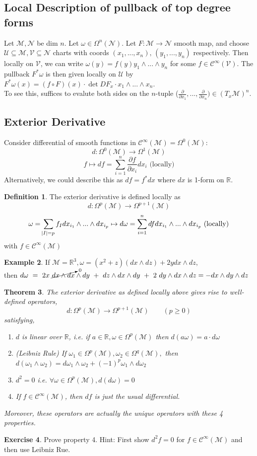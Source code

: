 \documentclass[10pt]{article}
\theoremstyle{plain}
\newtheorem{thm}{Theorem}[section] %
\theoremstyle{definition}
\newtheorem{defn}[thm]{Definition} %
\newtheorem{exmp}[thm]{Example} %
\newtheorem{exercise}[thm]{Exercise}
\newcommand{\Real}{\mathbb{R}}
\newcommand{\man}{\mathcal{M}}
\newcommand{\nan}{\mathcal{N}}
\newcommand{\chartU}{\mathcal{U}}
\newcommand{\allthe}[3]{{#1}_{#2},...,{#1}_{#3}}
\newcommand{\wedgge}{\omega_1\wedge\omega_2}
\newcommand{\allthewedge}[3]{{#1}_{#2}\wedge...\wedge{#1}_{#3}}
\newcommand{\tang}{T_x\man}
\newcommand{\pformman}[1]{\Omega^{#1}(\man)}
\newcommand{\pformnan}[1]{\Omega^{#1}(\nan)}
\newcommand{\iparderiv}[1]{\frac{\partial}{\partial x_{#1}}}
\newcommand{\iparderivof}[2]{\frac{\partial {#2}}{\partial x_{#1}}}
\newcommand{\dx}{dx}
\newcommand{\dy}{dy}
\newcommand{\dz}{dz}
\newcommand{\deriv}{d}
\newcommand{\df}{df}
\newcommand{\dw}{d\omega}
\newcommand{\cts}[1]{\mathcal{C}^{\infty}(#1)}
\newcommand{\sumfromto}[2]{\sum\limits_{#1}^{#2}}
\newcommand{\mysection}[1]{
    \setcounter{thm}{0}
    \section*{#1}
    \addcontentsline{toc}{section}{#1}
    \addtocounter{section}{1}
    \setcounter{subsection}{0}

}
\newcommand{\mysubsection}[1]{
    \subsection{#1}
}
\begin{document}
\mysubsection{Local Description of pullback of top degree forms}
Let $\man,\nan$ be dim $n$. Let $\omega \in \pformnan{n}$. Let $F:\man \to \nan$ smooth map, and choose $\chartU \subseteq\man, \mathcal{V} \subseteq\nan$ charts with coords $(\allthe{x}{1}{n}) , \, (\allthe{y}{1}{n})$ respectively. Then locally on $\mathcal{V}$, we can write $\omega(y) = f(y) \allthewedge{y}{1}{n}$ for some $f\in \cts{\mathcal{V}}$. The pullback $F^*\omega$ is then given locally on $\chartU$ by $F^*\omega(x) = (f\circ F)(x) \cdot \det DF_x \cdot \allthewedge{x}{1}{n}.$ \\
To see this, suffices to evalute both sides on the $n$-tuple ($\iparderiv{1},...,\iparderiv{n})\in(\tang)^n$.
\mysubsection{Exterior Derivative}
Consider differential of smooth functions in $\cts{\man} = \pformman{0}$:
$$\deriv : \pformman{0} \to \pformman{1}$$
$$ f \mapsto \df = \sumfromto{i=1}{n} \iparderivof{i}{f} \dx_i \text{   (locally)}$$
Alternatively, we could describe this as $\df = f^* \dx$ where $\dx$ is 1-form on $\Real$.
\begin{defn}
The exterior derivative is defined locally as
$$\deriv : \pformman{p} \to \pformman{p+1}$$
$$ \omega = \sum\limits_{\abs{I} = p} f_I \allthewedge{dx}{i_1}{i_p}\mapsto \dw = \sumfromto{i=1}{n} \df \allthewedge{dx}{i_1}{i_p} \text{   (locally)}$$
with $f\in\cts{\man}$
\end{defn}
\begin{exmp}
If $\man = \Real^3, \omega = (x^2 + z)(\dx\wedge\dz) + 2y\dx\wedge\dz$,\\ then $\dw~=~2x~\cancelto{0}{\dx\wedge\dx}\wedge\dy~+~\dz\wedge\dx\wedge\dy~+~2~\dy\wedge\dx\wedge\dz = - \dx\wedge\dy\wedge\dz $
\end{exmp}

\begin{thm}
The exterior derivative as defined locally above gives rise to well-defined operators,
$$\deriv : \pformman{p} \to \pformman{p+1} \qquad (p\geq 0)$$
satisfying,
\begin{enumerate}
    \item $\deriv$ is linear over $\Real$, i.e. if $a\in\Real,\omega \in \pformman{p}$ then $\deriv(a\omega) = a \cdot\dw$
    \item (Leibniz Rule) If $\omega_1 \in \pformman{p},\omega_2 \in \pformman{q}, $ then $\deriv(\wedgge) = \dw_1\wedge\omega_2 +(-1)^p\omega_1\wedge \dw_2$
    \item $\deriv ^2 = 0$ i.e. $\forall \omega \in \pformman{p} , \deriv(\dw) = 0$
    \item If $f\in\cts{\man}$, then $\df$ is just the usual differential.
\end{enumerate}
Moreover, these operators are actually the unique operators with these 4 properties.
\end{thm}
\begin{exercise}
Prove property 4. Hint: First show $\deriv^2f = 0$ for $f\in\cts{\man}$ and then use Leibniz Rue.
\end{exercise}
\end{document}
